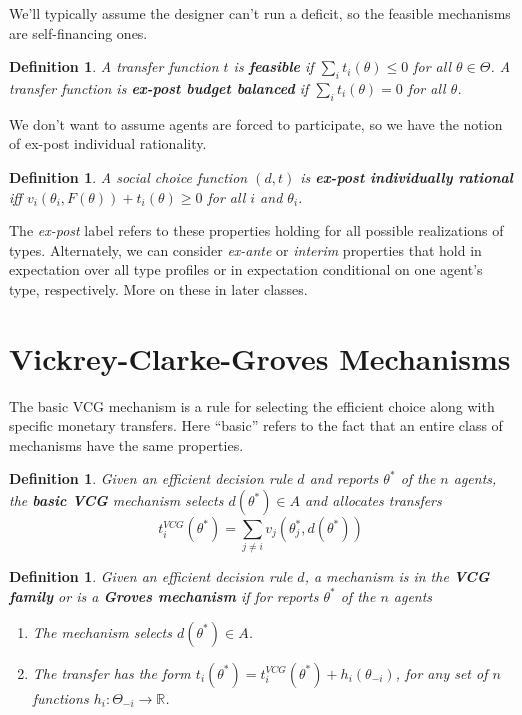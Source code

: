 \documentclass[letter, 10pt]{article}
\newtheorem{definition}[theorem]{Definition}
\theoremstyle{definition}
\newcommand{\R}{\mathbb{R}}
\begin{document}
\begin{spacing}{1.1}
We'll typically assume the designer can't run a deficit, so the feasible
mechanisms are self-financing ones.

\begin{definition}
  A transfer function $t$ is \textbf{feasible} if $\sum_i t_i(\theta) \leq
  0$ for all $\theta \in \Theta$. A transfer function is \textbf{ex-post
    budget balanced} if $\sum_i t_i(\theta) = 0$ for all $\theta$.
\end{definition}

We don't want to assume agents are forced to participate, so we have the
notion of ex-post individual rationality.

\begin{definition}
  A social choice function $(d,t)$ is \textbf{ex-post
    individually rational} iff $v_i(\theta_i,F(\theta))+
  t_i(\theta) \geq 0$ for all $i$ and $\theta_i$.
\end{definition}

The \textit{ex-post} label refers to these properties holding for all
possible realizations of types. Alternately, we can consider
\textit{ex-ante} or \textit{interim} properties that hold in expectation
over all type profiles or in expectation conditional on one agent's type,
respectively. More on these in later classes.

\section{Vickrey-Clarke-Groves Mechanisms}
\label{sec:vickr-clarke-grov}

The basic VCG mechanism is a rule for selecting the efficient choice along
with specific monetary transfers. Here ``basic'' refers to the fact that an
entire class of mechanisms have the same properties.

\begin{definition}
  Given an efficient decision rule $d$ and reports $\theta^*$ of the $n$
  agents, the \textbf{basic VCG} mechanism selects $d(\theta^*)\in A$ and
  allocates transfers \[t_i^{VCG}(\theta^*)=\sum_{j\neq i}
  v_j(\theta_j^*,d(\theta^*))\]
\end{definition}

\begin{definition}
  Given an efficient decision rule $d$, a mechanism is in the \textbf{VCG
    family} or is a \textbf{Groves mechanism} if for reports $\theta^*$ of
  the $n$ agents
  \begin{enumerate}
  \item The mechanism selects $d(\theta^*) \in A$.
  \item The transfer has the form $t_i(\theta^*) = t_i^{VCG}(\theta^*)
    + h_i(\theta_{-i})$, for any set of $n$
    functions $h_i:\Theta_{-i} \to \R$.
  \end{enumerate}
\end{definition}


\end{spacing}
\end{document}
